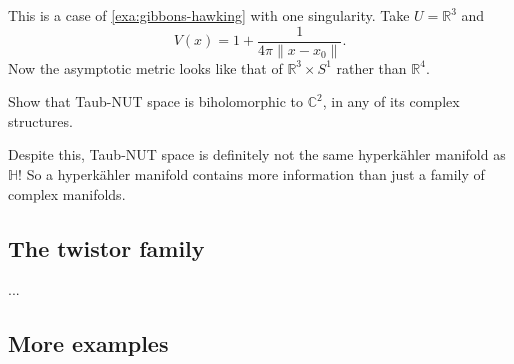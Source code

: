 \documentclass[12pt,letterpaper,reqno]{amsart}
\numberwithin{equation}{section}
\newcommand{\R}{\ensuremath{\mathbb R}}
\newcommand{\C}{\ensuremath{\mathbb C}}
\newcommand{\bbH}{\ensuremath{\mathbb H}}
\newcommand{\hk}{hyperk\"ahler\xspace}
\newcommand{\norm}[1]{\lVert#1\rVert}
\newcommand{\fixme}[1]{{\color{blue}{[#1]}}}
\begin{document}
\begin{example}
This is a case of \autoref{exa:gibbons-hawking}
with one singularity. 
Take $U = \R^3$ and
\begin{equation}
  V(x) = 1 + \frac{1}{4\pi \norm{x-x_0}}.
\end{equation}
Now the asymptotic metric looks like that of $\R^3 \times S^1$
rather than $\R^4$.
\end{example}

\begin{exercise} Show that Taub-NUT space is
biholomorphic to $\C^2$, in any of its complex
structures.
\end{exercise}

Despite this, Taub-NUT space is definitely not the same
\hk manifold as $\bbH$! So a \hk manifold contains more 
information than just a family of complex manifolds.


\subsection{The twistor family}

...

\fixme{twistor family}


\subsection{More examples}

\begin{example}[$\R^2 \times T^2$] \fixme{...}
\end{example}

\begin{example} \fixme{...}
\end{example}

\begin{example}[K3 surface] \fixme{...}
\end{example}

\fixme{reduced holonomy}

\fixme{Ricci-flatness}

\printbibliography
\end{document}
